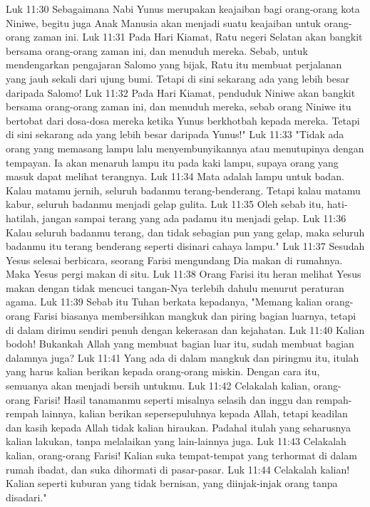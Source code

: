Luk 11:30  Sebagaimana Nabi Yunus merupakan keajaiban bagi orang-orang kota Niniwe, begitu juga Anak Manusia akan menjadi suatu keajaiban untuk orang-orang zaman ini.
Luk 11:31  Pada Hari Kiamat, Ratu negeri Selatan akan bangkit bersama orang-orang zaman ini, dan menuduh mereka. Sebab, untuk mendengarkan pengajaran Salomo yang bijak, Ratu itu membuat perjalanan yang jauh sekali dari ujung bumi. Tetapi di sini sekarang ada yang lebih besar daripada Salomo!
Luk 11:32  Pada Hari Kiamat, penduduk Niniwe akan bangkit bersama orang-orang zaman ini, dan menuduh mereka, sebab orang Niniwe itu bertobat dari dosa-dosa mereka ketika Yunus berkhotbah kepada mereka. Tetapi di sini sekarang ada yang lebih besar daripada Yunus!"
Luk 11:33  "Tidak ada orang yang memasang lampu lalu menyembunyikannya atau menutupinya dengan tempayan. Ia akan menaruh lampu itu pada kaki lampu, supaya orang yang masuk dapat melihat terangnya.
Luk 11:34  Mata adalah lampu untuk badan. Kalau matamu jernih, seluruh badanmu terang-benderang. Tetapi kalau matamu kabur, seluruh badanmu menjadi gelap gulita.
Luk 11:35  Oleh sebab itu, hati-hatilah, jangan sampai terang yang ada padamu itu menjadi gelap.
Luk 11:36  Kalau seluruh badanmu terang, dan tidak sebagian pun yang gelap, maka seluruh badanmu itu terang benderang seperti disinari cahaya lampu."
Luk 11:37  Sesudah Yesus selesai berbicara, seorang Farisi mengundang Dia makan di rumahnya. Maka Yesus pergi makan di situ.
Luk 11:38  Orang Farisi itu heran melihat Yesus makan dengan tidak mencuci tangan-Nya terlebih dahulu menurut peraturan agama.
Luk 11:39  Sebab itu Tuhan berkata kepadanya, "Memang kalian orang-orang Farisi biasanya membersihkan mangkuk dan piring bagian luarnya, tetapi di dalam dirimu sendiri penuh dengan kekerasan dan kejahatan.
Luk 11:40  Kalian bodoh! Bukankah Allah yang membuat bagian luar itu, sudah membuat bagian dalamnya juga?
Luk 11:41  Yang ada di dalam mangkuk dan piringmu itu, itulah yang harus kalian berikan kepada orang-orang miskin. Dengan cara itu, semuanya akan menjadi bersih untukmu.
Luk 11:42  Celakalah kalian, orang-orang Farisi! Hasil tanamanmu seperti misalnya selasih dan inggu dan rempah-rempah lainnya, kalian berikan sepersepuluhnya kepada Allah, tetapi keadilan dan kasih kepada Allah tidak kalian hiraukan. Padahal itulah yang seharusnya kalian lakukan, tanpa melalaikan yang lain-lainnya juga.
Luk 11:43  Celakalah kalian, orang-orang Farisi! Kalian suka tempat-tempat yang terhormat di dalam rumah ibadat, dan suka dihormati di pasar-pasar.
Luk 11:44  Celakalah kalian! Kalian seperti kuburan yang tidak bernisan, yang diinjak-injak orang tanpa disadari."
